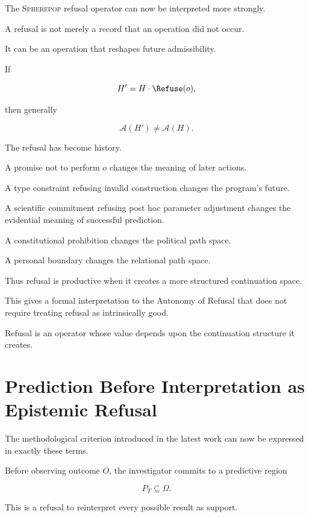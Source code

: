 \documentclass[11pt]{article}
\theoremstyle{remark}
\newcommand{\Spherepop}{\textsc{Spherepop}}
\newcommand{\Adm}{\mathcal{A}}
\begin{document}
The \Spherepop{} refusal operator can now be interpreted more strongly.

A refusal is not merely a record that an operation did not occur.

It can be an operation that reshapes future admissibility.

If

\begin{equation}
H'
=
H\cdot\Refuse(o),
\end{equation}

then generally

\begin{equation}
\Adm(H')
\neq
\Adm(H).
\end{equation}

The refusal has become history.

A promise not to perform $o$ changes the meaning of later actions.

A type constraint refusing invalid construction changes the program's future.

A scientific commitment refusing post hoc parameter adjustment changes the evidential meaning of successful prediction.

A constitutional prohibition changes the political path space.

A personal boundary changes the relational path space.

Thus refusal is productive when it creates a more structured continuation space.

This gives a formal interpretation to the Autonomy of Refusal that does not require treating refusal as intrinsically good.

Refusal is an operator whose value depends upon the continuation structure it creates.

\section{Prediction Before Interpretation as Epistemic Refusal}

The methodological criterion introduced in the latest work can now be expressed in exactly these terms.

Before observing outcome $O$, the investigator commits to a predictive region

\begin{equation}
P_T\subseteq\Omega.
\end{equation}

This is a refusal to reinterpret every possible result as support.
\end{document}
